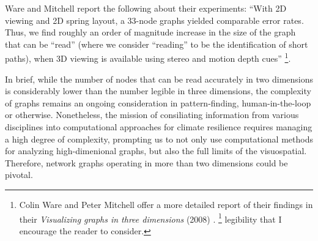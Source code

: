 Ware and Mitchell report the following about their experiments: “With 2D viewing and 2D spring layout, a 33-node graphs yielded comparable error rates. Thus, we find roughly an order of magnitude increase in the size of the graph that can be “read” (where we consider “reading” to be the identification of short paths), when 3D viewing is available using stereo and motion depth cues” \citep[p. 10]{ware_visualizing_2008} \footnote{Colin Ware and Peter Mitchell offer a more detailed report of their findings in their \textit{Visualizing graphs in three dimensions} (2008) \citep{ware_visualizing_2008}. \footnote{Ware and Mitchell distinguish the number of links as a key factor to consider: “The degree of correlation we found was surprisingly high and the regression equation suggests that adding 25 more links for a given number of nodes results in an additional 1\% increase in error rate” \citep[p. 13]{ware_visualizing_2008}. This 25:1 ratio can guide dimensionality reduction of larger high-dimensional graphs for optically legibility and accessibility. Furthermore Ware and Mitchell go on to discuss a variety of other factors to consider in three-dimensional network graph} legibility that I encourage the reader to consider.}. 

In brief, while the number of nodes that can be read accurately in two dimensions is considerably lower than the number legible in three dimensions, the complexity of graphs remains an ongoing consideration in pattern-finding, human-in-the-loop or otherwise. Nonetheless, the mission of consiliating information from various disciplines into computational approaches for climate resilience requires managing a high degree of complexity, prompting us to not only use computational methods for analyzing high-dimenional graphs, but also the full limits of the visuospatial. Therefore, network graphs operating in more than two dimensions could be pivotal.  

